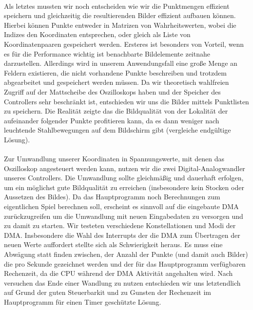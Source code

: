 \paragraph*{}
Als letztes mussten wir noch entscheiden wie wir die Punktmengen effizient speichern und gleichzeitig die resultierenden Bilder effizient aufbauen können. Hierbei können Punkte entweder in Matrizen von Wahrheitswerten, wobei die Indizes den Koordinaten entsprechen, oder gleich als Liste von Koordinatenpaaren gespeichert werden. Ersteres ist besonders von Vorteil, wenn es für die Performance wichtig ist benachbarte Bildelemente zeitnahe darzustellen. Allerdings wird in unserem Anwendungsfall eine große Menge an Feldern existieren, die nicht vorhandene Punkte beschreiben und trotzdem abgearbeitet und gespeichert werden müssen. Da wir theoretisch wahlfreien Zugriff auf der Mattscheibe des Oszilloskops haben und der Speicher des Controllers sehr beschränkt ist, entschieden wir uns die Bilder mittels Punktlisten zu speichern. Die Realität zeigte das die Bildqualität von der Lokalität der aufeinander folgender Punkte profitieren kann, da es dann weniger nach leuchtende Stahlbewegungen auf dem Bildschirm gibt (vergleiche endgültige Lösung).

\paragraph*{}
Zur Umwandlung unserer Koordinaten in Spannungswerte, mit denen das Oszilloskop angesteuert werden kann, nutzen wir die zwei Digital-Analogwandler unseres Controllers. Die Umwandlung sollte gleichmäßig und dauerhaft erfolgen, um ein möglichst gute Bildqualität zu erreichen (insbesondere kein Stocken oder Aussetzen des Bildes). Da das Hauptprogramm noch Berechnungen zum eigentlichen Spiel berechnen soll, erscheint es sinnvoll auf die eingebaute DMA zurückzugreifen um die Umwandlung mit neuen Eingabedaten zu versorgen und zu damit zu starten. Wir testeten verschiedene Konstellationen und Modi der DMA. Insbesondere die Wahl des Interrupts der die DMA zum Übertragen der neuen Werte auffordert stellte sich als Schwierigkeit heraus. Es muss eine Abwägung statt finden zwischen, der Anzahl der Punkte (und damit auch Bilder) die pro Sekunde gezeichnet werden und der für das Hauptprogramm verfügbaren Rechenzeit, da die CPU während der DMA Aktivität angehalten wird. Nach versuchen das Ende einer Wandlung zu nutzen entschieden wir uns letztendlich auf Grund der guten Steuerbarkit und zu Gunsten der Rechenzeit im Hauptprogramm für einen Timer geschützte Lösung.

